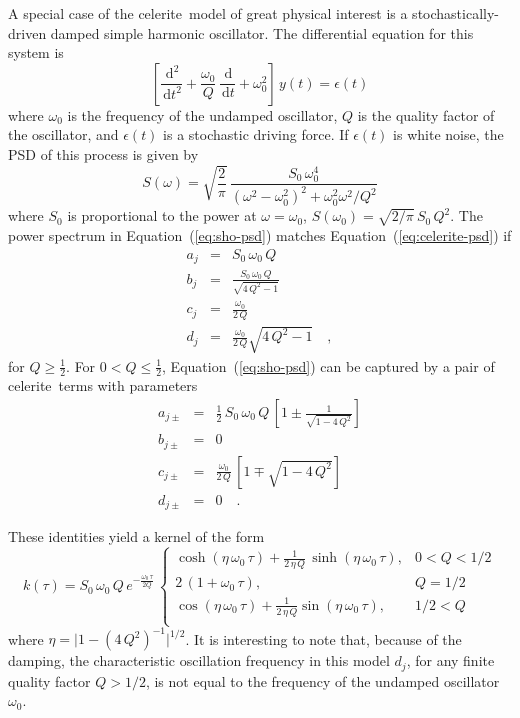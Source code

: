 \documentclass[manuscript, letterpaper]{aastex6}
\newcommand{\project}[1]{\textsf{#1}}
\newcommand{\celerite}{\project{celerite}}
\renewcommand{\eqref}[1]{\ref{eq:#1}}
\newcommand{\Eq}[1]{Equation~(\eqref{#1})}
\newcommand{\eq}[1]{\Eq{#1}}
\newcommand{\eqlabel}[1]{\label{eq:#1}}
\newcommand{\dd}{\ensuremath{\,\mathrm{d}}}
\begin{document}
A special case of the \celerite\ model of great physical interest is a
stochastically-driven damped simple harmonic oscillator.
The differential equation for this system is
\begin{equation}
    \left[\frac{\dd^2}{\dd t^2} + \frac{\omega_0}{Q}\,\frac{\dd}{\dd t}
    + \omega_0^2\right]\, y(t) = \epsilon(t)
\end{equation}
where $\omega_0$ is the frequency of the undamped oscillator, $Q$ is the
quality factor of the oscillator, and $\epsilon(t)$ is a stochastic driving
force.
If $\epsilon(t)$ is white noise, the PSD of this process is given by
\citep[for example][]{Anderson:1990}
\begin{equation}\eqlabel{sho-psd}
S(\omega) = \sqrt{\frac{2}{\pi}}\,\frac{S_0\,\omega_0^4}
    {(\omega^2-\omega_0^2)^2 + \omega_0^2\omega^2/Q^2}
\end{equation}
where $S_0$ is proportional to the power at $\omega = \omega_0$, $S(\omega_0)
= \sqrt{2/\pi}\,S_0\,Q^2$.
The power spectrum in \eq{sho-psd} matches \eq{celerite-psd} if
\begin{eqnarray}\eqlabel{sho-complex}
a_j &=& S_0\,\omega_0\,Q \\
b_j &=& \frac{S_0\,\omega_0\,Q}{\sqrt{4\,Q^2-1}} \\
c_j &=& \frac{\omega_0}{2\,Q}\\
d_j &=& \frac{\omega_0}{2\,Q} \sqrt{4\,Q^2-1} \quad,
\end{eqnarray}
for $Q \ge \frac{1}{2}$.
For $0 < Q \le \frac{1}{2}$, \eq{sho-psd} can be captured by a pair of \celerite\
terms with parameters
\begin{eqnarray}\eqlabel{sho-real}
a_{j\pm} &=& \frac{1}{2}\,S_0\,\omega_0\,Q\,\left[ 1 \pm
        \frac{1}{\sqrt{1-4\,Q^2}}\right] \\
b_{j\pm} &=& 0 \nonumber\\
    c_{j\pm} &=& \frac{\omega_0}{2\,Q}\,\left[1 \mp \sqrt{1-4\,Q^2}\right]
    \nonumber\\
d_{j\pm} &=& 0 \quad. \nonumber
\end{eqnarray}

These identities yield a kernel of the form
\begin{equation}\eqlabel{sho-kernel}
k(\tau) = S_0\,\omega_0\,Q\,e^{-\frac{\omega_0\,\tau}{2Q}}\,
\begin{cases}
    \cosh{(\eta\,\omega_0\,\tau)} +
        \frac{1}{2\,\eta\,Q}\,\sinh{(\eta\,\omega_0\,\tau)}, & 0 < Q < 1/2\\
    2\,(1+\omega_0\,\tau), & Q = 1/2\\
    \cos{(\eta\,\omega_0\,\tau)} +
        \frac{1}{2\,\eta\,Q} \sin{(\eta\,\omega_0\,\tau)},& 1/2 < Q\\
\end{cases}
\end{equation}
where $\eta = \vert 1-(4\,Q^2)^{-1}\vert^{1/2}$.
It is interesting to note that, because of the damping, the characteristic
oscillation frequency in this model $d_j$, for any finite quality factor $Q > 1/2$,
is not equal to the frequency of the undamped oscillator $\omega_0$.
\end{document}

